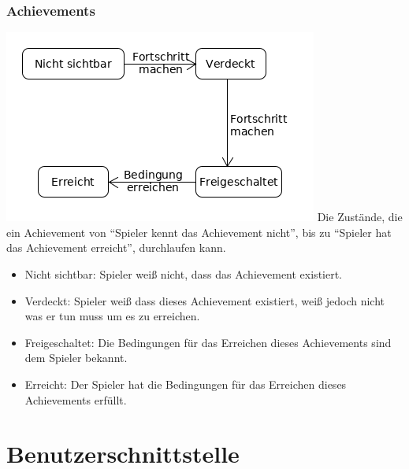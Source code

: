 \documentclass[a4paper]{scrreprt}
\begin{document}
    \subsection{Achievements}
    \label{fig:Achievment_State}
    \includegraphics[width=\textwidth]{uml/export/Achievment_State.png}
    Die Zustände, die ein \Gls{Achievement} von \enquote{\Gls{Spieler} kennt das \Gls{Achievement} nicht}, bis zu \enquote{\Gls{Spieler} hat das \Gls{Achievement} erreicht}, durchlaufen kann.
    \begin{itemize}
    \item Nicht sichtbar: \Gls{Spieler} weiß nicht, dass das \Gls{Achievement} existiert.
    \item Verdeckt: \Gls{Spieler} weiß dass dieses \Gls{Achievement} existiert, weiß jedoch nicht was er tun muss um es zu erreichen.
    \item Freigeschaltet: Die Bedingungen für das Erreichen dieses \Gls{Achievement}s sind dem \Gls{Spieler} bekannt.
    \item Erreicht: Der \Gls{Spieler} hat die Bedingungen für das Erreichen dieses \Gls{Achievement}s erfüllt.
    \end{itemize}
    

    \chapter{Benutzerschnittstelle}
\end{document}
